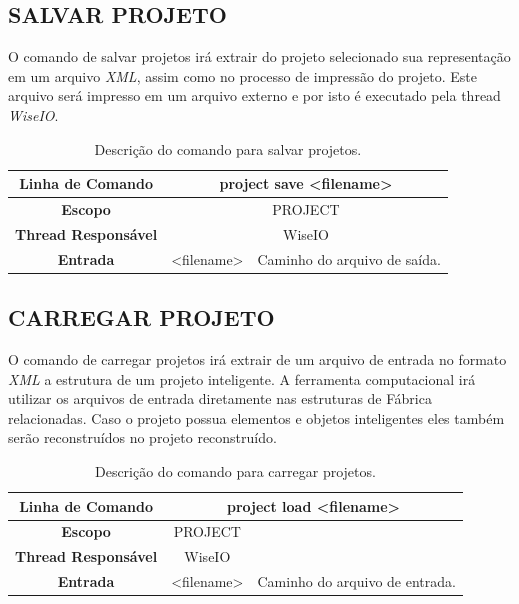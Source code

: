 \subsection{SALVAR PROJETO}\label{sec:save_projects}

O comando de salvar projetos irá extrair do projeto selecionado sua representação em um arquivo \textit{XML}, assim como no processo de impressão do projeto. Este arquivo será impresso em um arquivo externo e por isto é executado pela thread \textit{WiseIO}.

\begin{center}
	\begin{table}[!htbp]
		\begin{tabular}{|c|c|m{}|}
			\hline
			\textbf{Linha de Comando} & \multicolumn{2}{c|}{project save <file\underline{\space\space}name>} \\
			\hline
			\textbf{Escopo} & \multicolumn{2}{c|}{PROJECT} \\
			\hline
			\textbf{Thread Responsável} & \multicolumn{2}{c|}{WiseIO} \\
			\hline
			\textbf{Entrada} & <file\underline{\space\space}name> & Caminho do arquivo de saída. \\
			\hline
		\end{tabular}
		\caption{Descrição do comando para salvar projetos.}
		\label{tab:save_project}
	\end{table}
\end{center}

\subsection{CARREGAR PROJETO}\label{sec:load_projects}

O comando de carregar projetos irá extrair de um arquivo de entrada no formato \textit{XML} a estrutura de um projeto inteligente. A ferramenta computacional irá utilizar os arquivos de entrada diretamente nas estruturas de Fábrica relacionadas. Caso o projeto possua elementos e objetos inteligentes eles também serão reconstruídos no projeto reconstruído.

\begin{center}
	\begin{table}[!htbp]
		\begin{tabular}{|c|c|m{}|}
			\hline
			\textbf{Linha de Comando} & \multicolumn{2}{c|}{project load <filename>} \\
			\hline
			\textbf{Escopo} & \multicolumn{1}{c|}{PROJECT} \\
			\hline
			\textbf{Thread Responsável} & \multicolumn{1}{c|}{WiseIO} \\
			\hline
			\textbf{Entrada} & <filename> & Caminho do arquivo de entrada. \\
			\hline
		\end{tabular}
		\caption{Descrição do comando para carregar projetos.}
		\label{tab:load_project}
	\end{table}
\end{center}

